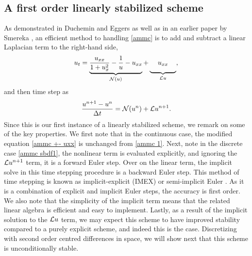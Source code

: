 \subsection{A first order linearly stabilized scheme}
As demonstrated in Duchemin and Eggers \cite{duchemin2014explicit} as well as in an earlier paper by Smereka \cite{smereka2003semi}, an efficient method to handling \eqref{ammc} is to add and subtract a linear Laplacian term to the right-hand side, 
\begin{align}
u_t = \underbrace{\frac{u_{xx}}{1 + u_x^2} 
- \frac{1}{u} 
- u_{xx}}_{\N(u)} 
+ \underbrace{\phantom{\frac{1_1}{1}}u_{xx}\phantom{\frac{1}{1_1}}}_{\L u}, 
\label{ammc +- uxx}
\end{align} 
and then time step as 
\begin{align}
\frac{u^{n+1} - u^n}{\Delta t} 
= \mathcal{N}(u^n) + \mathcal{L} u^{n+1}.
\label{ammc sbdf1}
\end{align}
Since this is our first instance of a linearly stabilized scheme, we remark on some of the key properties. We first note that in the continuous case, the modified equation \eqref{ammc +- uxx} is unchanged from \eqref{ammc 1}. Next, note in the discrete case \eqref{ammc sbdf1}, the nonlinear term is evaluated explicitly, and ignoring the $\mathcal{L} u^{n+1}$ term, it is a forward Euler step. Over on the linear term, the implicit solve in this time stepping procedure is a backward Euler step. This method of time stepping is known as implicit-explicit (IMEX) or semi-implicit Euler \cite{ascher1995implicit,smereka2003semi}. As it is a combination of explicit and implicit Euler steps, the accuracy is first order. We also note that the simplicity of the implicit term means that the related linear algebra is efficient and easy to implement. Lastly, as a result of the implicit solution to the $\mathcal{L} u$ term, we may expect this scheme to have improved stability compared to a purely explicit scheme, and indeed this is the case. Discretizing with second order centred differences in space, we will show next that this scheme is unconditionally stable.

